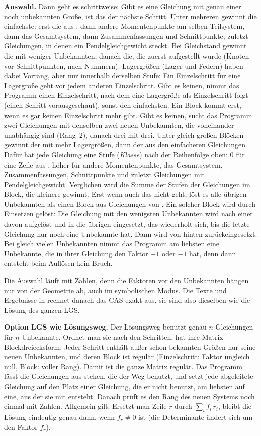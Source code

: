 \textbf{Auswahl.} Dann geht es schrittweise: Gibt es eine Gleichung mit genau einer noch unbekannten
Größe, ist das der nächste Schritt. Unter mehreren gewinnt die einfachste: erst die aus ,
dann andere Momentenpunkte am selben Teilsystem, dann das Gesamtsystem, dann Zusammenfassungen und
Schnittpunkte, zuletzt Gleichungen, in denen ein Pendelgleichgewicht steckt. Bei Gleichstand gewinnt
die mit weniger Unbekannten, danach die, die zuerst aufgestellt wurde (Knoten vor Schnittpunkten,
nach Nummern). Lagergrößen (Lager und Federn) haben dabei Vorrang, aber nur innerhalb derselben
Stufe: Ein Einzelschritt für eine Lagergröße geht vor jedem anderen Einzelschritt. Gibt es keinen,
nimmt das Programm einen Einzelschritt, nach dem eine Lagergröße als Einzelschritt folgt (einen
Schritt vorausgeschaut), sonst den einfachsten. Ein Block kommt erst, wenn es gar keinen
Einzelschritt mehr gibt. Gibt es keinen, sucht das Programm zwei Gleichungen mit denselben zwei neuen
Unbekannten, die voneinander unabhängig sind (Rang~2), danach drei mit drei. Unter gleich großen
Blöcken gewinnt der mit mehr Lagergrößen, dann der aus den einfacheren Gleichungen. Dafür hat jede
Gleichung eine Stufe (\emph{Klasse}) nach der Reihenfolge oben: $0$ für eine Zeile aus ,
höher für andere Momentenpunkte, das Gesamtsystem, Zusammenfassungen, Schnittpunkte und zuletzt
Gleichungen mit Pendelgleichgewicht. Verglichen wird die Summe der Stufen der Gleichungen im Block,
die kleinere gewinnt. Erst wenn auch das nicht geht, löst es alle übrigen Unbekannten als einen
Block aus Gleichungen von . Ein solcher Block wird durch Einsetzen gelöst: Die Gleichung
mit den wenigsten Unbekannten wird nach einer davon aufgelöst und in die übrigen eingesetzt, das
wiederholt sich, bis die letzte Gleichung nur noch eine Unbekannte hat. Dann wird von hinten
zurückeingesetzt. Bei gleich vielen Unbekannten nimmt das Programm am liebsten eine Unbekannte, die
in ihrer Gleichung den Faktor $+1$ oder $-1$ hat, denn dann entsteht beim Auflösen kein Bruch.

Die Auswahl läuft mit Zahlen, denn die Faktoren vor den Unbekannten hängen nur von der Geometrie ab,
auch im symbolischen Modus. Die Texte und Ergebnisse in  rechnet danach das CAS
exakt aus, sie sind also dieselben wie die Lösung des ganzen LGS.

\textbf{Option LGS wie Lösungsweg.} Der Lösungsweg benutzt genau $n$ Gleichungen für $n$
Unbekannte. Ordnet man sie nach den Schritten, hat ihre Matrix Blockdreiecksform: Jeder Schritt
enthält außer schon bekannten Größen nur seine neuen Unbekannten, und deren Block ist regulär
(Einzelschritt: Faktor ungleich null, Block: voller Rang). Damit ist die ganze Matrix regulär. Das
Programm lässt die Gleichungen aus  stehen, die der Weg benutzt, und setzt jede
abgeleitete Gleichung auf den Platz einer Gleichung, die er nicht benutzt, am liebsten auf eine,
aus der sie mit entsteht. Danach prüft es den Rang des neuen Systems noch einmal mit Zahlen. Allgemein
gilt: Ersetzt man Zeile $r$ durch $\sum_i f_i\, r_i$, bleibt die Lösung eindeutig genau dann, wenn
$f_r \neq 0$ ist (die Determinante ändert sich um den Faktor $f_r$).


